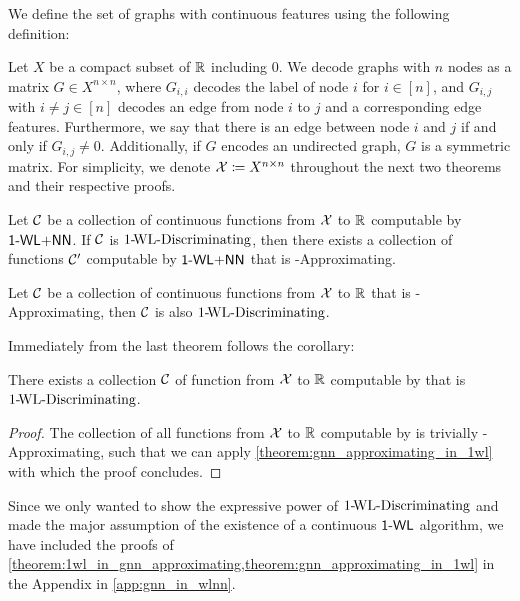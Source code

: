 We define the set of graphs with continuous features using the following definition:
\begin{definition}
    Let $X$ be a compact subset of $\mathbb{R}$ including $0$. We decode graphs with $n$ nodes as a matrix $G \in X^{n \times n}$, where $G_{i,i}$ decodes the label of node $i$ for $i \in [n]$, and $G_{i,j}$ with $i \neq j \in [n]$ decodes an edge from node $i$ to $j$ and a corresponding edge features. Furthermore, we say that there is an edge between node $i$ and $j$ if and only if $G_{i,j} \neq 0$. Additionally, if $G$ encodes an undirected graph, $G$ is a symmetric matrix. For simplicity, we denote $\mathcal{X} \coloneqq X^{n \times n}$ throughout the next two theorems and their respective proofs.
\end{definition}

\begin{theorem}\label{theorem:1wl_in_gnn_approximating}
    Let $\mathcal{C}$ be a collection of continuous functions from $\mathcal{X}$ to $\mathbb{R}$ computable by $\textsf{1-WL+NN}$. If $\mathcal{C}$ is $\text{1-\!WL-Discriminating}$, then there exists a collection of functions $\mathcal{C}'$ computable by $\textsf{1-WL+NN}$ that is \gnn-Approximating.
\end{theorem}

\begin{theorem}\label{theorem:gnn_approximating_in_1wl}
    Let $\mathcal{C}$ be a collection of continuous functions from $\mathcal{X}$ to $\mathbb{R}$ that is \gnn-Approximating, then $\mathcal{C}$ is also $\text{1-\!WL-Discriminating}$.
\end{theorem}
Immediately from the last theorem follows the corollary:
\begin{corollary}
    There exists a collection $\mathcal{C}$ of function from $\mathcal{X}$ to $\mathbb{R}$ computable by \gnns that is $\text{1-\!WL-Discriminating}$.
\end{corollary}

\begin{proof}
    The collection of all functions from $\mathcal{X}$ to $\mathbb{R}$ computable by \gnns is trivially \gnn-Approximating, such that we can apply \autoref{theorem:gnn_approximating_in_1wl} with which the proof concludes.
\end{proof}

Since we only wanted to show the expressive power of $\text{1-\!WL-Discriminating}$ and made the major assumption of the existence of a continuous $\textsf{1-WL}$ algorithm, we have included the proofs of \cref{theorem:1wl_in_gnn_approximating,theorem:gnn_approximating_in_1wl} in the Appendix in \autoref{app:gnn_in_wlnn}.

